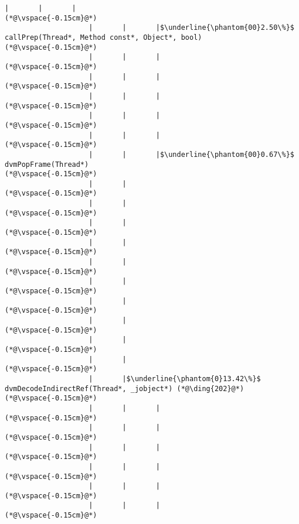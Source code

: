 \begin{lstlisting}[caption=Metodikutsu C$\to$Java 20 int-parametrilla, label=profile:C2JBenchmark00146, numberbychapter=true, frame=lines, float, floatplacement=t]
                    |       |       |
(*@\vspace{-0.15cm}@*)
                    |       |       |$\underline{\phantom{00}2.50\%}$ callPrep(Thread*, Method const*, Object*, bool)
(*@\vspace{-0.15cm}@*)
                    |       |       |
(*@\vspace{-0.15cm}@*)
                    |       |       |
(*@\vspace{-0.15cm}@*)
                    |       |       |
(*@\vspace{-0.15cm}@*)
                    |       |       |
(*@\vspace{-0.15cm}@*)
                    |       |       |
(*@\vspace{-0.15cm}@*)
                    |       |       |$\underline{\phantom{00}0.67\%}$ dvmPopFrame(Thread*)
(*@\vspace{-0.15cm}@*)
                    |       |
(*@\vspace{-0.15cm}@*)
                    |       |
(*@\vspace{-0.15cm}@*)
                    |       |
(*@\vspace{-0.15cm}@*)
                    |       |
(*@\vspace{-0.15cm}@*)
                    |       |
(*@\vspace{-0.15cm}@*)
                    |       |
(*@\vspace{-0.15cm}@*)
                    |       |
(*@\vspace{-0.15cm}@*)
                    |       |
(*@\vspace{-0.15cm}@*)
                    |       |
(*@\vspace{-0.15cm}@*)
                    |       |
(*@\vspace{-0.15cm}@*)
                    |       |$\underline{\phantom{0}13.42\%}$ dvmDecodeIndirectRef(Thread*, _jobject*) (*@\ding{202}@*)
(*@\vspace{-0.15cm}@*)
                    |       |       |
(*@\vspace{-0.15cm}@*)
                    |       |       |
(*@\vspace{-0.15cm}@*)
                    |       |       |
(*@\vspace{-0.15cm}@*)
                    |       |       |
(*@\vspace{-0.15cm}@*)
                    |       |       |
(*@\vspace{-0.15cm}@*)
                    |       |       |
(*@\vspace{-0.15cm}@*)

\end{lstlisting}
